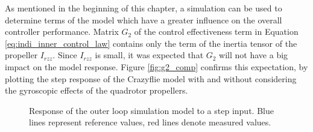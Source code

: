 \documentclass[11pt, a4paper, twoside]{report}
\begin{document}
As mentioned in the beginning of this chapter, a simulation can be used to determine terms of the model which have a greater influence on the overall controller performance. Matrix $G_2$ of the control effectiveness term in Equation \ref{eq:indi_inner_control_law} contains only the term of the inertia tensor of the propeller $I_{rzz}$. Since $I_{rzz}$ is small, it was expected that $G_2$ will not have a big impact on the model response. Figure \ref{fig:g2_comp} confirms this expectation, by plotting the step response of the Crazyflie model with and without considering  the gyroscopic effects of the quadrotor propellers. 
\begin{figure}[H]
	\centering 
	\captionsetup{justification=centering, singlelinecheck=off, font=bf, belowskip=-0.5cm}
	\caption[Response of the outer loop simulation model to a step input.]{Response of the outer loop simulation model to a step input. Blue lines represent reference values, red lines denote measured values.}
	\label{fig:sim_outer_all}
\end{figure}
\end{document}
